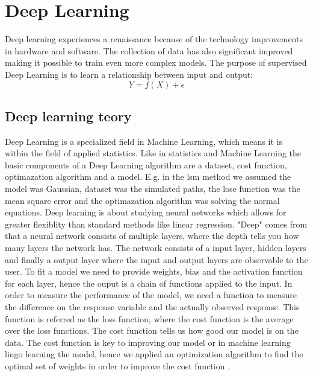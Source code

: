 
\chapter{Deep Learning} %

\label{Chapter4} %

Deep learning experiences a renaissance because of the technology improvements in hardware and software. The collection of data has also significant improved making it possible to train even more complex models. The purpose of supervised Deep Learning is to learn a relationship between input and output:
$$Y=f(X) + \epsilon$$




\section{Deep learning teory}
Deep Learning is a specialized field in Machine Learning, which means it is within the field of applied statistics. Like in statistics and Machine Learning the basic components of a Deep Learning algorithm are a dataset, cost function, optimazation algorithm and a model. E.g. in the lsm method we assumed the model was Gaussian, dataset was the simulated paths, the lose function was the mean square error and the optimazation algorithm was solving the normal equations. Deep learning is about studying neural networks which allows for greater flexiblity than standard methods like linear regression. "Deep" comes from that a neural network consists of multiple layers, where the depth tells you how many layers the network has. The network consists of a input layer, hidden layers and finally a output layer where the input and output layers are observable to the user. To fit a model we need to provide weights, bias and the activation function for each layer, hence the ouput is a chain of functions applied to the input. In order to measure the performance of the model, we need a function to measure the difference on the response variable and the actually observed response. This function is referred as the loss function, where the cost function is the average over the loss functions. The cost function tells us how good our model is on the data. The cost function is key to improving our model or in machine learning lingo learning the model, hence we applied an optimization algorithm to find the optimal set of weights in order to improve the cost function \parencite{Goodfellow-et-al-2016}.

